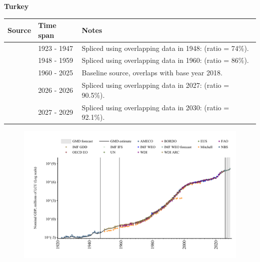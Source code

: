 \documentclass[12pt,a4paper,landscape]{article}
\begin{document}
\begin{adjustbox}{max totalsize={\paperwidth}{\paperheight},center}
\begin{minipage}[t][\textheight][t]{\textwidth}
\vspace*{0.5cm}
{}
\begin{center}
{\Large\bfseries Turkey}
\end{center}
\vspace{0.5cm}
\begin{table}[H]
\centering
\small
\begin{tabular}{|l|l|l|}
\hline
\textbf{Source} & \textbf{Time span} & \textbf{Notes} \\
\hline
\rowcolor{white}\cite{NBS}& 1923 - 1947 &Spliced using overlapping data in 1948: (ratio = 74\%).\\
\rowcolor{lightgray}\cite{IMF_GDD}& 1948 - 1959 &Spliced using overlapping data in 1960: (ratio = 86\%).\\
\rowcolor{white}\cite{OECD_EO}& 1960 - 2025 &Baseline source, overlaps with base year 2018.\\
\rowcolor{lightgray}\cite{AMECO}& 2026 - 2026 &Spliced using overlapping data in 2027: (ratio = 90.5\%).\\
\rowcolor{white}\cite{IMF_WEO_forecast}& 2027 - 2029 &Spliced using overlapping data in 2030: (ratio = 92.1\%).\\
\hline
\end{tabular}
\end{table}
\begin{figure}[H]
\centering
\includegraphics[width=\textwidth,height=0.6\textheight,keepaspectratio]{graphs/TUR_nGDP.pdf}
\end{figure}
\end{minipage}
\end{adjustbox}
\end{document}
